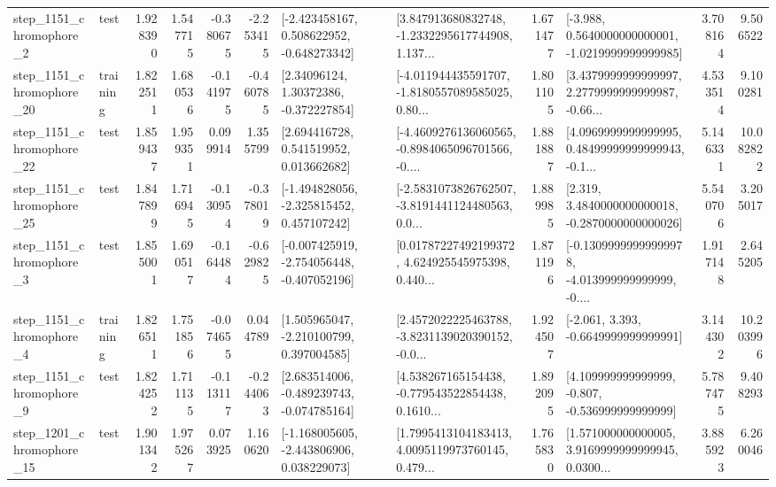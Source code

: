 \begin{tabular}{llrrrrllrlrr}
  step\_1151\_chromophore\_2 &      test &      1.928390 &    1.547715 &     -0.380675 & -2.253415 &   [-2.423458167, 0.508622952, -0.648273342] &  [3.847913680832748, -1.2332295617744908, 1.137... &       1.671477 &  [-3.988, 0.5640000000000001, -1.0219999999999985] &            3.708164 &          9.506522 \\
 step\_1151\_chromophore\_20 &  training &      1.822511 &    1.680536 &     -0.141975 & -0.460785 &      [2.34096124, 1.30372386, -0.372227854] &  [-4.011944435591707, -1.8180557089585025, 0.80... &       1.801105 &  [3.4379999999999997, 2.2779999999999987, -0.66... &            4.533514 &          9.100281 \\
 step\_1151\_chromophore\_22 &      test &      1.859437 &    1.959351 &      0.099914 &  1.355799 &     [2.694416728, 0.541519952, 0.013662682] &  [-4.4609276136060565, -0.8984065096701566, -0.... &       1.881887 &  [4.0969999999999995, 0.48499999999999943, -0.1... &            5.146331 &         10.082822 \\
 step\_1151\_chromophore\_25 &      test &      1.847899 &    1.716945 &     -0.130954 & -0.378019 &   [-1.494828056, -2.325815452, 0.457107242] &  [-2.5831073826762507, -3.8191441124480563, 0.0... &       1.889985 &   [2.319, 3.4840000000000018, -0.2870000000000026] &            5.540706 &          3.205017 \\
  step\_1151\_chromophore\_3 &      test &      1.855001 &    1.690517 &     -0.164484 & -0.629825 &  [-0.007425919, -2.754056448, -0.407052196] &  [0.01787227492199372, 4.624925545975398, 0.440... &       1.871196 &  [-0.13099999999999978, -4.013999999999999, -0.... &            1.917148 &          2.645205 \\
  step\_1151\_chromophore\_4 &  training &      1.826511 &    1.751856 &     -0.074655 &  0.044789 &    [1.505965047, -2.210100799, 0.397004585] &  [2.4572022225463788, -3.8231139020390152, -0.0... &       1.924507 &               [-2.061, 3.393, -0.6649999999999991] &            3.144302 &         10.203996 \\
  step\_1151\_chromophore\_9 &      test &      1.824252 &    1.711135 &     -0.113117 & -0.244063 &   [2.683514006, -0.489239743, -0.074785164] &  [4.538267165154438, -0.779543522854438, 0.1610... &       1.892095 &    [4.109999999999999, -0.807, -0.536999999999999] &            5.787475 &          9.408293 \\
 step\_1201\_chromophore\_15 &      test &      1.901342 &    1.975267 &      0.073925 &  1.160620 &   [-1.168005605, -2.443806906, 0.038229073] &  [1.7995413104183413, 4.0095119973760145, 0.479... &       1.765830 &  [1.571000000000005, 3.9169999999999945, 0.0300... &            3.885923 &          6.260046 \\

\end{tabular}
